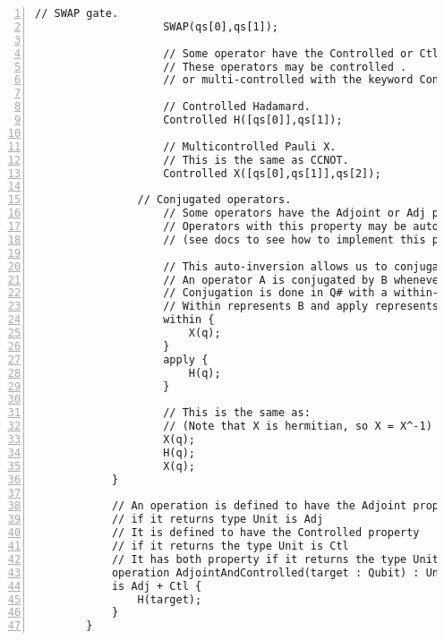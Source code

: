 \documentclass[
10pt, %
a4  paper, %
twoside, %
headinclude,footinclude, %
BCOR=5mm, %
]{scrartcl}
\begin{document}
\begin{Verbatim}[gobble=2, numbers=left, frame=lines,
        framesep=3mm,
        label={[Beginning of code]End of code}]
                    // SWAP gate.
                    SWAP(qs[0],qs[1]);

                    // Some operator have the Controlled or Ctl property.
                    // These operators may be controlled .
                    // or multi-controlled with the keyword Controll.

                    // Controlled Hadamard.
                    Controlled H([qs[0]],qs[1]);

                    // Multicontrolled Pauli X.
                    // This is the same as CCNOT.
                    Controlled X([qs[0],qs[1]],qs[2]);

                // Conjugated operators.
                    // Some operators have the Adjoint or Adj property.
                    // Operators with this property may be auto inverted .
                    // (see docs to see how to implement this property by hand)
                    
                    // This auto-inversion allows us to conjugate an operator.
                    // An operator A is conjugated by B whenever we do BAB^-1.
                    // Conjugation is done in Q# with a within-apply block.
                    // Within represents B and apply represents A.
                    within {
                        X(q);
                    }
                    apply {
                        H(q);
                    }

                    // This is the same as:
                    // (Note that X is hermitian, so X = X^-1)
                    X(q);
                    H(q);
                    X(q);
            }

            // An operation is defined to have the Adjoint property
            // if it returns type Unit is Adj
            // It is defined to have the Controlled property
            // if it returns the type Unit is Ctl
            // It has both property if it returns the type Unit is Adj + Ctl
            operation AdjointAndControlled(target : Qubit) : Unit
            is Adj + Ctl {
                H(target);
            }
        }
    \end{Verbatim}
\end{document}
